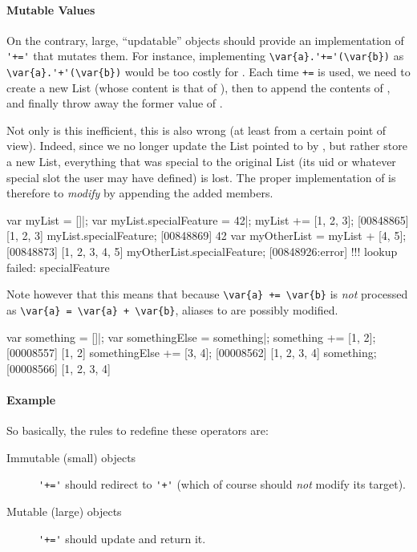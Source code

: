 \paragraph{Mutable Values}
On the contrary, large, ``updatable'' objects should provide an
implementation of \lstinline|'+='| that mutates them.  For instance,
implementing \lstinline|\var{a}.'+='(\var{b})| as
\lstinline|\var{a}.'+'(\var{b})| would be too costly for
.  Each time \lstinline|+=| is used, we need to create a
new List (whose content is that of ), then to append the contents of
, and finally throw away the former value of .

Not only is this inefficient, this is also wrong (at least from a certain
point of view).  Indeed, since we no longer update the List pointed to by
, but rather store a new List, everything that was special to the
original List (its uid or whatever special slot the user may have defined)
is lost.  The proper implementation of  is therefore to
\emph{modify} \this by appending the added members.

\begin{urbiscript}
var myList = []|;
var myList.specialFeature = 42|;
myList += [1, 2, 3];
[00848865] [1, 2, 3]
myList.specialFeature;
[00848869] 42
var myOtherList = myList + [4, 5];
[00848873] [1, 2, 3, 4, 5]
myOtherList.specialFeature;
[00848926:error] !!! lookup failed: specialFeature
\end{urbiscript}

Note however that this means that because \lstinline|\var{a} += \var{b}| is
\emph{not} processed as \lstinline|\var{a} = \var{a} + \var{b}|, aliases to
 are possibly modified.

\begin{urbiscript}
var something = []|;
var somethingElse = something|;
something += [1, 2];
[00008557] [1, 2]
somethingElse += [3, 4];
[00008562] [1, 2, 3, 4]
something;
[00008566] [1, 2, 3, 4]
\end{urbiscript}

\paragraph{Example}
So basically, the rules to redefine these operators are:
\begin{description}
\item[Immutable (small) objects] \lstinline|'+='| should redirect to
  \lstinline|'+'| (which of course should \emph{not} modify its target).
\item[Mutable (large) objects] \lstinline|'+='| should update \this and
  return it.
\end{description}

